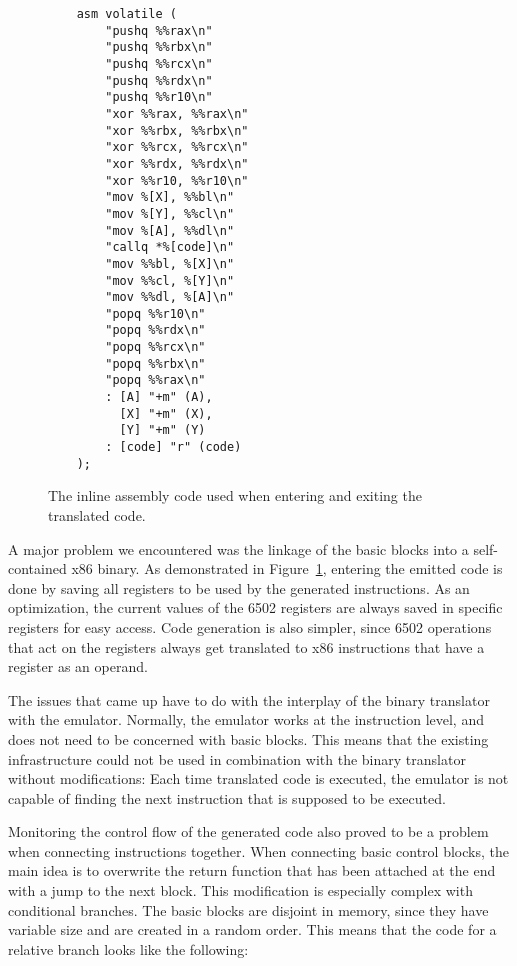 \begin{figure}[!h]
\begin{lstlisting}
    asm volatile (
        "pushq %%rax\n"
        "pushq %%rbx\n"
        "pushq %%rcx\n"
        "pushq %%rdx\n"
        "pushq %%r10\n"
        "xor %%rax, %%rax\n"
        "xor %%rbx, %%rbx\n"
        "xor %%rcx, %%rcx\n"
        "xor %%rdx, %%rdx\n"
        "xor %%r10, %%r10\n"
        "mov %[X], %%bl\n"
        "mov %[Y], %%cl\n"
        "mov %[A], %%dl\n"
        "callq *%[code]\n"
        "mov %%bl, %[X]\n"
        "mov %%cl, %[Y]\n"
        "mov %%dl, %[A]\n"
        "popq %%r10\n"
        "popq %%rdx\n"
        "popq %%rcx\n"
        "popq %%rbx\n"
        "popq %%rax\n"
        : [A] "+m" (A),
          [X] "+m" (X), 
          [Y] "+m" (Y) 
        : [code] "r" (code)
    );
\end{lstlisting}
    \caption {The inline assembly code used when entering and exiting the translated code.}
    \label{fig:code}
\end{figure}
 
A major problem we encountered was the linkage of the basic blocks into a
self-contained x86 binary.  As demonstrated in Figure~\ref{fig:code}, entering
the emitted code is done by saving all registers to be used by the generated
instructions.  As an optimization, the current values of the 6502 registers are
always saved in specific registers for easy access.  Code generation is also
simpler, since 6502 operations that act on the registers always get translated
to x86 instructions that have a register as an operand.

The issues that came up have to do with the interplay of the binary translator
with the emulator.  Normally, the emulator works at the instruction level, and
does not need to be concerned with basic blocks.  This means that the existing
infrastructure could not be used in combination with the binary translator
without modifications: Each time translated code is executed, the emulator is
not capable of finding the next instruction that is supposed to be executed.

Monitoring the control flow of the generated code also proved to be a problem
when connecting instructions together.  When connecting basic control blocks,
the main idea is to overwrite the return function that has been attached at the
end with a jump to the next block.  This modification is especially complex
with conditional branches.  The basic blocks are disjoint in memory, since they
have variable size and are created in a random order.
This means that the code for a relative branch looks like the following:

